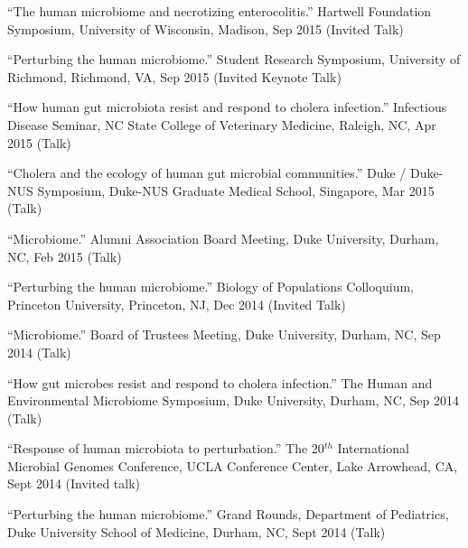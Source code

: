 \documentclass[overlapped,line,11pt]{res}
\begin{document}
\begin{resume}
\begin{revnumerate}[43]
\item {``The human microbiome and necrotizing enterocolitis.''
  Hartwell Foundation Symposium, University of Wisconsin, Madison, Sep 2015
  (Invited Talk)}
\vspace*{0mm}

\item {``Perturbing the human microbiome.''
  Student Research Symposium, University of Richmond, Richmond, VA, Sep 2015
  (Invited Keynote Talk)}
\vspace*{0mm}

\item {``How human gut microbiota resist and respond to cholera infection.''
  Infectious Disease Seminar, NC State College of Veterinary Medicine, Raleigh, NC, Apr 2015
  (Talk)}
\vspace*{0mm}

\item {``Cholera and the ecology of human gut microbial communities.''
  Duke / Duke-NUS Symposium, Duke-NUS Graduate Medical School, Singapore, Mar 2015 (Talk)}
\vspace*{0mm}

\item {``Microbiome.''
  Alumni Association Board Meeting, Duke University,
  Durham, NC, Feb 2015
  (Talk)}
\vspace*{0mm}

\item {``Perturbing the human microbiome.''
  Biology of Populations Colloquium, Princeton University, Princeton, NJ, Dec 2014
  (Invited Talk)}
\vspace*{0mm}

\item {``Microbiome.''
  Board of Trustees Meeting, Duke University,
  Durham, NC, Sep 2014
  (Talk)}
\vspace*{0mm}

\item {``How gut microbes resist and respond to cholera infection.''
  The Human and Environmental Microbiome Symposium, Duke University,
  Durham, NC, Sep 2014
  (Talk)}
\vspace*{0mm}

\item {``Response of human microbiota to perturbation.''
  The 20$^{th}$ International Microbial Genomes Conference, UCLA
  Conference Center, Lake Arrowhead, CA, Sept 2014
  (Invited talk)}
\vspace*{0mm}

\item {``Perturbing the human microbiome.''
  Grand Rounds, Department of Pediatrics, Duke University School of
  Medicine, Durham, NC, Sept 2014
  (Talk)}
\vspace*{0mm}


\end{revnumerate}
\end{resume}
\end{document}
